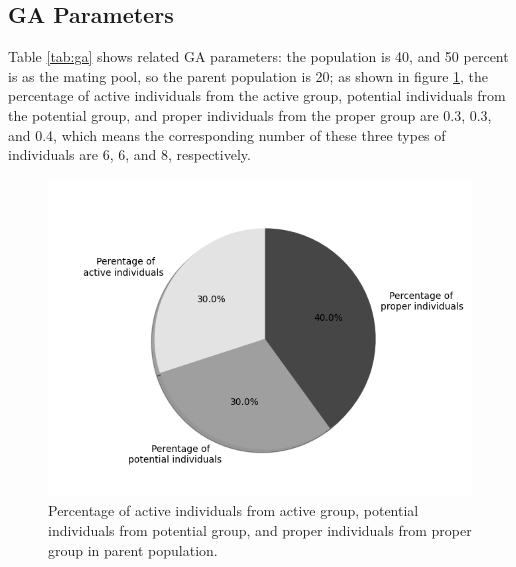 \subsection{GA Parameters}
Table \ref{tab:ga} shows related GA parameters: the population is 40, and 50
percent is as the mating pool, so the parent population is 20; as
shown in figure \ref{fig:percentage}, the percentage of active individuals from
the active group, potential individuals from the potential group, and proper
individuals from the proper group are 0.3, 0.3, and 0.4, which means the
corresponding number of these three types of individuals are 6, 6, and 8,
respectively.

\begin{figure}[!htb]
	\centering
	\includegraphics[width=\linewidth]{fig/percentage_of_groups}
	\caption{Percentage of active individuals from active group, potential
	  individuals from potential group, and proper individuals from proper group
	 in parent population.}
	 \label{fig:percentage}
\end{figure}



